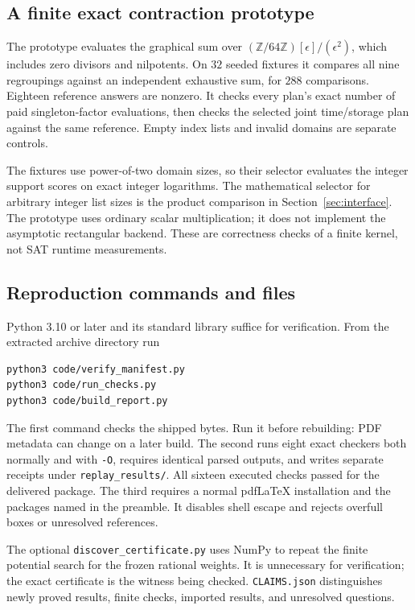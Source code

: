 \subsection{A finite exact contraction prototype}

The prototype evaluates the graphical sum over
$(\mathbb Z/64\mathbb Z)[\epsilon]/(\epsilon^2)$, which includes zero
divisors and nilpotents. On $32$ seeded fixtures it compares all nine
regroupings against an independent exhaustive sum, for $288$ comparisons.
Eighteen reference answers are nonzero. It checks every plan's exact
number of paid singleton-factor evaluations, then checks the selected
joint time/storage plan against the same reference. Empty index lists and
invalid domains are separate controls.

The fixtures use power-of-two domain sizes, so their selector evaluates
the integer support scores on exact integer logarithms. The mathematical
selector for arbitrary integer list sizes is the product comparison in
Section~\ref{sec:interface}. The prototype uses ordinary scalar
multiplication; it does not implement the asymptotic rectangular backend.
These are correctness checks of a finite kernel, not SAT runtime
measurements.

\subsection{Reproduction commands and files}

Python 3.10 or later and its standard library suffice for verification.
From the extracted archive directory run
\begin{verbatim}
python3 code/verify_manifest.py
python3 code/run_checks.py
python3 code/build_report.py
\end{verbatim}
The first command checks the shipped bytes. Run it before rebuilding:
PDF metadata can change on a later build. The second runs eight exact
checkers both normally and with \texttt{-O}, requires identical parsed
outputs, and writes separate receipts under \texttt{replay\_results/}.
All sixteen executed checks passed for the delivered package. The third
requires a normal pdfLaTeX installation and the packages named in the
preamble. It disables shell escape and rejects overfull boxes or unresolved
references.

The optional \texttt{discover\_certificate.py} uses NumPy to repeat the
finite potential search for the frozen rational weights. It is unnecessary
for verification; the exact certificate is the witness being checked.
\texttt{CLAIMS.json} distinguishes newly proved results, finite checks,
imported results, and unresolved questions.

